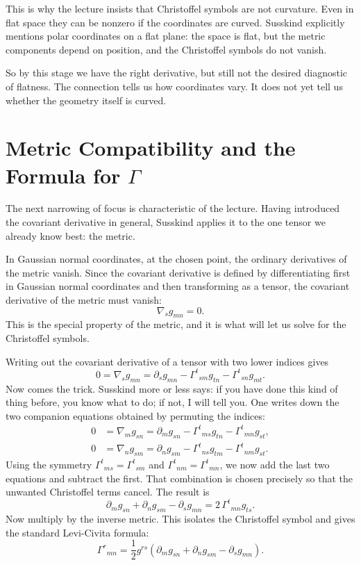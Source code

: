 This is why the lecture insists that Christoffel symbols are not curvature. Even in flat space they can be nonzero if the coordinates are curved. Susskind explicitly mentions polar coordinates on a flat plane: the space is flat, but the metric components depend on position, and the Christoffel symbols do not vanish.

So by this stage we have the right derivative, but still not the desired diagnostic of flatness. The connection tells us how coordinates vary. It does not yet tell us whether the geometry itself is curved.

\section{Metric Compatibility and the Formula for \texorpdfstring{$\Gamma$}{Gamma}}

The next narrowing of focus is characteristic of the lecture. Having introduced the covariant derivative in general, Susskind applies it to the one tensor we already know best: the metric.

In Gaussian normal coordinates, at the chosen point, the ordinary derivatives of the metric vanish. Since the covariant derivative is defined by differentiating first in Gaussian normal coordinates and then transforming as a tensor, the covariant derivative of the metric must vanish:
\begin{equation}
\nabla_s g_{mn}=0.
\end{equation}
This is the special property of the metric, and it is what will let us solve for the Christoffel symbols.

Writing out the covariant derivative of a tensor with two lower indices gives
\begin{equation}
0
=
\nabla_s g_{mn}
=
\partial_s g_{mn}
-\Gamma^{t}{}_{sm}g_{tn}
-\Gamma^{t}{}_{sn}g_{mt}.
\end{equation}
Now comes the trick. Susskind more or less says: if you have done this kind of thing before, you know what to do; if not, I will tell you. One writes down the two companion equations obtained by permuting the indices:
\begin{align}
0
&=
\nabla_m g_{sn}
=
\partial_m g_{sn}
-\Gamma^{t}{}_{ms}g_{tn}
-\Gamma^{t}{}_{mn}g_{st},\\
0
&=
\nabla_n g_{sm}
=
\partial_n g_{sm}
-\Gamma^{t}{}_{ns}g_{tm}
-\Gamma^{t}{}_{nm}g_{st}.
\end{align}
Using the symmetry \(\Gamma^{t}{}_{ms}=\Gamma^{t}{}_{sm}\) and \(\Gamma^{t}{}_{nm}=\Gamma^{t}{}_{mn}\), we now add the last two equations and subtract the first. That combination is chosen precisely so that the unwanted Christoffel terms cancel. The result is
\begin{equation}
\partial_m g_{sn}+\partial_n g_{sm}-\partial_s g_{mn}
=
2\,\Gamma^{t}{}_{mn}g_{ts}.
\end{equation}
Now multiply by the inverse metric. This isolates the Christoffel symbol and gives the standard Levi-Civita formula:
\begin{equation}
\Gamma^{r}{}_{mn}
=
\frac12 g^{rs}
\left(
\partial_m g_{sn}
+
\partial_n g_{sm}
-
\partial_s g_{mn}
\right).
\end{equation}


